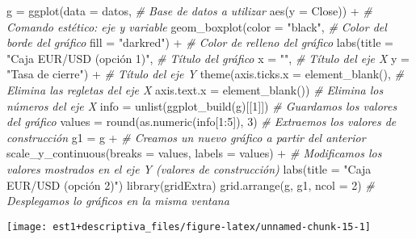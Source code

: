 \documentclass[
]{book}
\newenvironment{Shaded}{\begin{snugshade}}{\end{snugshade}}
\newcommand{\AttributeTok}[1]{\textcolor[rgb]{0.77,0.63,0.00}{#1}}
\newcommand{\CommentTok}[1]{\textcolor[rgb]{0.56,0.35,0.01}{\textit{#1}}}
\newcommand{\DecValTok}[1]{\textcolor[rgb]{0.00,0.00,0.81}{#1}}
\newcommand{\FunctionTok}[1]{\textcolor[rgb]{0.00,0.00,0.00}{#1}}
\newcommand{\NormalTok}[1]{#1}
\newcommand{\OtherTok}[1]{\textcolor[rgb]{0.56,0.35,0.01}{#1}}
\newcommand{\SpecialCharTok}[1]{\textcolor[rgb]{0.00,0.00,0.00}{#1}}
\newcommand{\StringTok}[1]{\textcolor[rgb]{0.31,0.60,0.02}{#1}}
\begin{document}
\begin{Shaded}
\begin{Highlighting}[]
\NormalTok{g }\OtherTok{=} \FunctionTok{ggplot}\NormalTok{(}\AttributeTok{data =}\NormalTok{ datos, }\CommentTok{\# Base de datos a utilizar}
       \FunctionTok{aes}\NormalTok{(}\AttributeTok{y =}\NormalTok{ Close)) }\SpecialCharTok{+} \CommentTok{\# Comando estético: eje y variable}
  \FunctionTok{geom\_boxplot}\NormalTok{(}\AttributeTok{color =} \StringTok{"black"}\NormalTok{, }\CommentTok{\# Color del borde del gráfico}
               \AttributeTok{fill =} \StringTok{"darkred"}\NormalTok{) }\SpecialCharTok{+} \CommentTok{\# Color de relleno del gráfico}
  \FunctionTok{labs}\NormalTok{(}\AttributeTok{title =} \StringTok{"Caja EUR/USD (opción 1)"}\NormalTok{, }\CommentTok{\# Título del gráfico}
       \AttributeTok{x =} \StringTok{""}\NormalTok{, }\CommentTok{\# Título del eje X}
       \AttributeTok{y =} \StringTok{"Tasa de cierre"}\NormalTok{) }\SpecialCharTok{+} \CommentTok{\# Título del eje Y}
  \FunctionTok{theme}\NormalTok{(}\AttributeTok{axis.ticks.x =} \FunctionTok{element\_blank}\NormalTok{(), }\CommentTok{\# Elimina las regletas del eje X}
        \AttributeTok{axis.text.x =} \FunctionTok{element\_blank}\NormalTok{()) }\CommentTok{\# Elimina los números del eje X}
\NormalTok{info }\OtherTok{=} \FunctionTok{unlist}\NormalTok{(}\FunctionTok{ggplot\_build}\NormalTok{(g)[[}\DecValTok{1}\NormalTok{]]) }\CommentTok{\# Guardamos los valores del gráfico}
\NormalTok{values }\OtherTok{=} \FunctionTok{round}\NormalTok{(}\FunctionTok{as.numeric}\NormalTok{(info[}\DecValTok{1}\SpecialCharTok{:}\DecValTok{5}\NormalTok{]), }\DecValTok{3}\NormalTok{) }\CommentTok{\# Extraemos los valores de construcción}
\NormalTok{g1 }\OtherTok{=}\NormalTok{ g }\SpecialCharTok{+} \CommentTok{\# Creamos un nuevo gráfico a partir del anterior}
  \FunctionTok{scale\_y\_continuous}\NormalTok{(}\AttributeTok{breaks =}\NormalTok{ values, }\AttributeTok{labels =}\NormalTok{ values) }\SpecialCharTok{+} \CommentTok{\# Modificamos los valores mostrados en el eje Y (valores de construcción)}
  \FunctionTok{labs}\NormalTok{(}\AttributeTok{title =} \StringTok{"Caja EUR/USD (opción 2)"}\NormalTok{)}
\FunctionTok{library}\NormalTok{(gridExtra)}
\FunctionTok{grid.arrange}\NormalTok{(g, g1, }\AttributeTok{ncol =} \DecValTok{2}\NormalTok{) }\CommentTok{\# Desplegamos lo gráficos en la misma ventana}
\end{Highlighting}
\end{Shaded}

\begin{center}\texttt{[image: est1+descriptiva\_files/figure-latex/unnamed-chunk-15-1]} \end{center}
\end{document}
